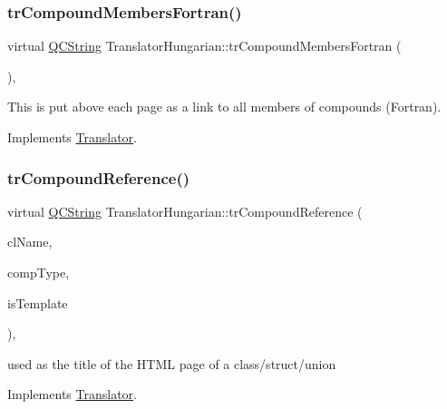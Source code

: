 \subsubsection{\texorpdfstring{trCompoundMembersFortran()}{trCompoundMembersFortran()}}
{\footnotesize\ttfamily virtual \mbox{\hyperlink{class_q_c_string}{Q\+C\+String}} Translator\+Hungarian\+::tr\+Compound\+Members\+Fortran (\begin{DoxyParamCaption}{ }\end{DoxyParamCaption})\hspace{0.3cm}{\ttfamily [inline]}, {\ttfamily [virtual]}}

This is put above each page as a link to all members of compounds (Fortran). 

Implements \mbox{\hyperlink{class_translator}{Translator}}.

\mbox{\label{class_translator_hungarian_ae38ffb1bf21458270cf0a1bcb076aa85}} 
\subsubsection{\texorpdfstring{trCompoundReference()}{trCompoundReference()}}
{\footnotesize\ttfamily virtual \mbox{\hyperlink{class_q_c_string}{Q\+C\+String}} Translator\+Hungarian\+::tr\+Compound\+Reference (\begin{DoxyParamCaption}\item[{const char $\ast$}]{cl\+Name,  }\item[{\mbox{\hyperlink{class_class_def_ae70cf86d35fe954a94c566fbcfc87939}{Class\+Def\+::\+Compound\+Type}}}]{comp\+Type,  }\item[{bool}]{is\+Template }\end{DoxyParamCaption})\hspace{0.3cm}{\ttfamily [inline]}, {\ttfamily [virtual]}}

used as the title of the H\+T\+ML page of a class/struct/union 

Implements \mbox{\hyperlink{class_translator}{Translator}}.

\mbox{\label{class_translator_hungarian_a4fd2dcf33f4f25e4fbc544a85791250b}} 
